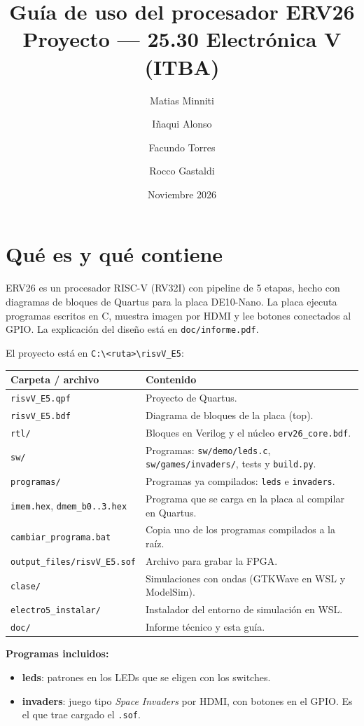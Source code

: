 \documentclass[11pt,a4paper]{article}
\title{\textbf{Guía de uso del procesador ERV26}\\[2pt]
\large Proyecto \code{risvV\_E5} --- 25.30 Electrónica V (ITBA)}
\author{Matias Minniti \and Iñaqui Alonso \and Facundo Torres \and Rocco Gastaldi}
\date{Noviembre 2026}
\newcommand{\code}[1]{\texttt{#1}}
\begin{document}
\maketitle
\tableofcontents

\section{Qué es y qué contiene}

ERV26 es un procesador RISC-V (RV32I) con pipeline de 5 etapas, hecho con diagramas de bloques de Quartus para la placa DE10-Nano. La placa ejecuta programas escritos en C, muestra imagen por HDMI y lee botones conectados al GPIO. La explicación del diseño está en \code{doc/informe.pdf}.

El proyecto está en \code{C:\textbackslash <ruta>\textbackslash risvV\_E5}:

\begin{center}
\begin{tabularx}{\linewidth}{lL}
\toprule
Carpeta / archivo & Contenido \\
\midrule
\code{risvV\_E5.qpf} & Proyecto de Quartus. \\
\code{risvV\_E5.bdf} & Diagrama de bloques de la placa (top). \\
\code{rtl/} & Bloques en Verilog y el núcleo \code{erv26\_core.bdf}. \\
\code{sw/} & Programas: \code{sw/demo/leds.c}, \code{sw/games/invaders/}, tests y \code{build.py}. \\
\code{programas/} & Programas ya compilados: \code{leds} e \code{invaders}. \\
\code{imem.hex}, \code{dmem\_b0..3.hex} & Programa que se carga en la placa al compilar en Quartus. \\
\code{cambiar\_programa.bat} & Copia uno de los programas compilados a la raíz. \\
\code{output\_files/risvV\_E5.sof} & Archivo para grabar la FPGA. \\
\code{clase/} & Simulaciones con ondas (GTKWave en WSL y ModelSim). \\
\code{electro5\_instalar/} & Instalador del entorno de simulación en WSL. \\
\code{doc/} & Informe técnico y esta guía. \\
\bottomrule
\end{tabularx}
\end{center}

\textbf{Programas incluidos:}
\begin{itemize}
\item \textbf{leds}: patrones en los LEDs que se eligen con los switches.
\item \textbf{invaders}: juego tipo \emph{Space Invaders} por HDMI, con botones en el GPIO. Es el que trae cargado el \code{.sof}.
\end{itemize}
\end{document}
